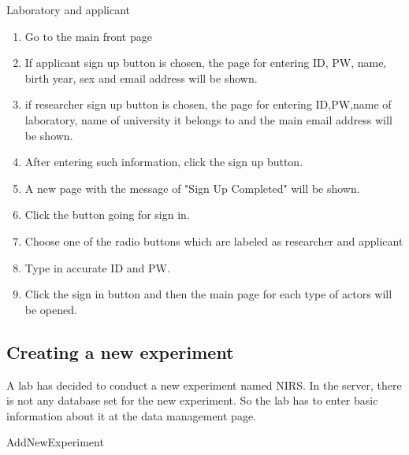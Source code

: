 \documentclass[letterpaper, 10 pt, conference]{ieeeconf}  %
\begin{document}
Laboratory and applicant\\

\begin{enumerate}
\item Go to the main front page
\item If applicant sign up button is chosen, the page for entering ID, PW, name, birth year, sex and email address will be shown.
\item if researcher sign up button is chosen, the page for entering ID,PW,name of laboratory, name of university it belongs to and the main email address will be shown.
\item After entering such information, click the sign up button.
\item A new page with the message of "Sign Up Completed" will be shown.
\item Click the button going for sign in. 
\item Choose one of the radio buttons which are labeled as researcher and applicant
\item Type in accurate ID and PW.
\item Click the sign in button and then the main page for each type of actors will be opened. 
\end{enumerate}


\subsection{Creating a new experiment}
A lab has decided to conduct a new experiment named NIRS. In the server, there is not any database set for the new experiment. So the lab has to enter basic information about it at the data management page.\\ 

AddNewExperiment\\
\end{document}
